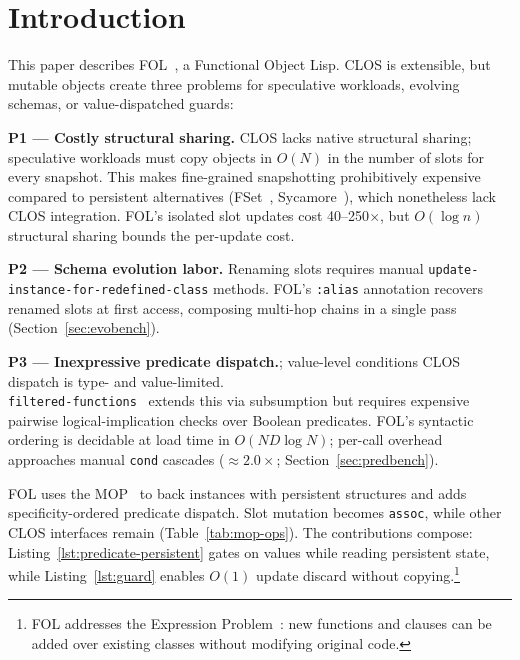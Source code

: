 \documentclass[sigconf,nonacm]{acmart}
\begin{document}


\maketitle

\section{Introduction}
\label{sec:intro}
This paper describes FOL~\cite{adrian2026fol-els}, a Functional Object Lisp.
CLOS is extensible, but mutable objects create three problems for speculative workloads, evolving schemas, or value-dispatched guards:

\textbf{P1 --- Costly structural sharing.}
CLOS lacks native structural sharing; speculative workloads must copy objects in $O(N)$ in the number of slots for every snapshot.
This makes fine-grained snapshotting prohibitively expensive compared to persistent alternatives (FSet~\cite{Burke2007}, Sycamore~\cite{Dantam2013}), which nonetheless lack CLOS integration.
FOL's isolated slot updates cost 40--250$\times$, but $O(\log n)$ structural sharing bounds the per-update cost.

\textbf{P2 --- Schema evolution labor.}
Renaming slots requires manual \texttt{update-instance-for-redefined-class} methods.
FOL's \texttt{:alias} annotation recovers renamed slots at first access, composing multi-hop chains in a single pass (Section~\ref{sec:evobench}).

\textbf{P3 --- Inexpressive predicate dispatch.}; value-level conditions 
CLOS dispatch is type- and value-limited.\\
\texttt{filtered-functions}~\cite{Orleans2002} extends this via subsumption but requires expensive pairwise logical-implication checks over Boolean predicates.
FOL's syntactic ordering is decidable at load time in $O(ND \log N)$; per-call overhead approaches manual \texttt{cond} cascades (${\approx}2.0{\times}$; Section~\ref{sec:predbench}).

FOL uses the MOP~\cite{Kiczales1991} to back instances with persistent structures and adds specificity-ordered predicate dispatch.
Slot mutation becomes \texttt{assoc}, while other CLOS interfaces remain (Table~\ref{tab:mop-ops}).
The contributions compose: Listing~\ref{lst:predicate-persistent} gates on values while reading persistent state,
while Listing~\ref{lst:guard} enables $O(1)$ update discard without copying.\footnote{FOL addresses the Expression Problem~\cite{Wadler1990}: new functions and clauses can be added over existing classes without modifying original code.}
\end{document}
